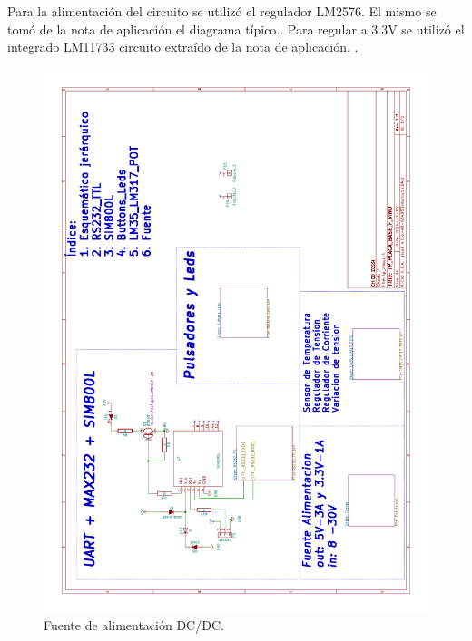 Para la alimentación del circuito se utilizó el regulador LM2576. El mismo se tomó de la nota de aplicación el diagrama típico.\citep{Texas:LM2576}.
Para regular a 3.3V se utilizó el integrado LM11733 circuito extraído de la nota de aplicación. \citep{Texas:LM11733}.
\begin{figure}[!htb]
  \centering
  \includegraphics[page=3,scale=0.3,angle=270]{./Figures/schematic.pdf}
  \caption{Fuente de alimentación DC/DC.}
  \label{fig:fuente}
\end{figure}

